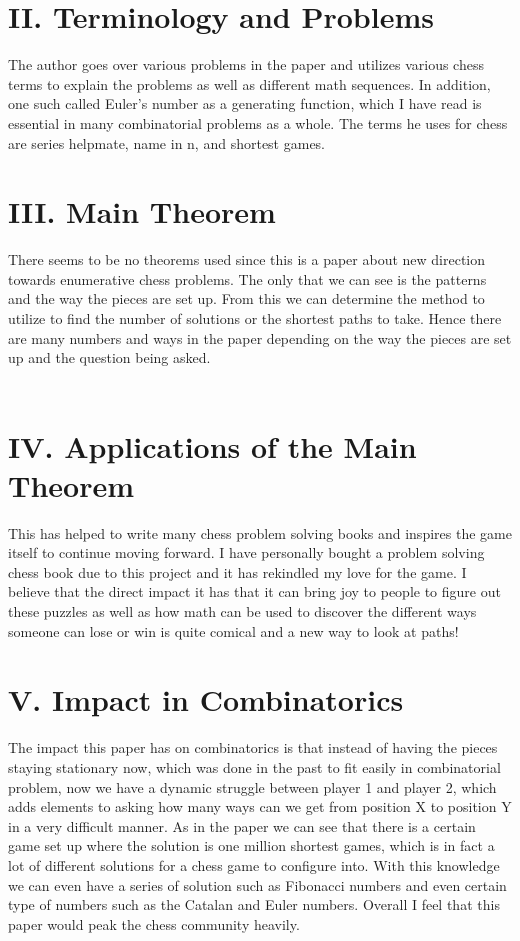 \documentclass[aps,prl,twocolumn,showpacs,superscriptaddress,groupedaddress]{revtex4}  %
\begin{document}
\section{\label{sec: level2}II. Terminology and Problems}
The author goes over various problems in the paper and utilizes various chess terms to explain the problems as well as different math sequences. In addition, one such called Euler's number as a generating function, which I have read is essential in many combinatorial problems as a whole. The terms he uses for chess are series helpmate, name in n, and shortest games. 

\section{\label{sec: level3}III. Main Theorem}
There seems to be no theorems used since this is a paper about new direction towards enumerative chess problems. The only that we can see is the patterns and the way the pieces are set up. From this we can determine the method to utilize to find the number of solutions or the shortest paths to take. Hence there are many numbers and ways in the paper depending on the way the pieces are set up and the question being asked. \\ \\

\section{\label{sec: level4}IV. Applications of the Main Theorem} 
This has helped to write many chess problem solving books and inspires the game itself to continue moving forward. I have personally bought a problem solving chess book due to this project and it has rekindled my love for the game. I believe that the direct impact it has that it can bring joy to people to figure out these puzzles as well as how math can be used to discover the different ways someone can lose or win is quite comical and a new way to look at paths! 

\section{\label{sec: level5}V. Impact in Combinatorics}
The impact this paper has on combinatorics is that instead of having the pieces staying stationary now, which was done in the past to fit easily in combinatorial problem, now we have a dynamic struggle between player 1 and player 2, which adds elements to asking how many ways can we get from position X to position Y in a very difficult manner. As in the paper we can see that there is a certain game set up where the solution is one million shortest games, which is in fact a lot of different solutions for a chess game to configure into. With this knowledge we can even have a series of solution such as Fibonacci numbers and even certain type of numbers such as the Catalan and Euler numbers. Overall I feel that this paper would peak the chess community heavily. 
\end{document}
